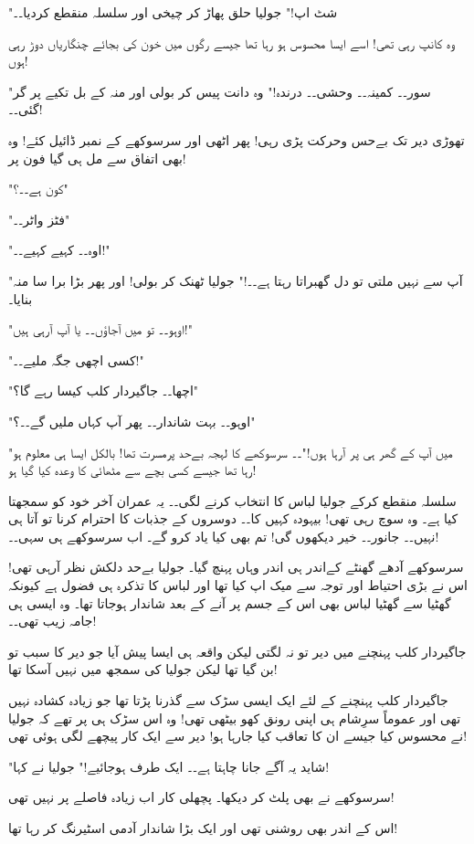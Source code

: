"شٹ اپ!" جولیا حلق پھاڑ کر چیخی اور سلسلہ منقطع کردیا۔۔

وہ کانپ رہی تھی! اسے ایسا محسوس ہو رہا تھا جیسے رگوں میں خون کی بجائے چنگاریاں دوڑ رہی ہوں!

"سور۔۔ کمینہ۔۔ وحشی۔۔ درندہ!" وہ دانت پیس کر بولی اور منہ کے بل تکیے پر گر گئی۔۔!

تھوڑی دیر تک بےحس وحرکت پڑی رہی! پھر اٹھی اور سرسوکھے کے نمبر ڈائیل کئے! وہ بھی اتفاق سے مل ہی گیا فون پر!

"کون ہے۔۔؟"

"فٹز واٹر۔۔"

"اوہ۔۔ کہیے کہیے۔۔!"

"آپ سے نہیں ملتی تو دل گھبراتا رہتا ہے۔۔!" جولیا ٹھنک کر بولی! اور پھر بڑا برا سا منہ بنایا۔

"اوہو۔۔ تو میں آجاؤں۔۔ یا آپ آرہی ہیں!"

"کسی اچھی جگہ ملیے۔۔!"

"اچھا۔۔ جاگیردار کلب کیسا رہے گا؟"

"اوہو۔۔ بہت شاندار۔۔ پھر آپ کہاں ملیں گے۔۔؟"

"میں آپ کے گھر ہی پر آرہا ہوں!"۔۔ سرسوکھے کا لہجہ بےحد پرمسرت تھا! بالکل ایسا ہی معلوم ہو رہا تھا جیسے کسی بچے سے مٹھائی کا وعدہ کیا گیا ہو!

سلسلہ منقطع کرکے جولیا لباس کا انتخاب کرنے لگی۔۔ یہ عمران آخر خود کو سمجھتا کیا ہے۔ وہ سوچ رہی تھی! بیہودہ کہیں کا۔۔ دوسروں کے جذبات کا احترام کرنا تو آتا ہی نہیں۔۔ جانور۔۔ خیر دیکھوں گی! تم بھی کیا یاد کرو گے۔ اب سرسوکھے ہی سہی۔۔!

سرسوکھے آدھے گھنٹے کےاندر ہی اندر وہاں پہنچ گیا۔ جولیا بےحد دلکش نظر آرہی تھی! اس نے بڑی احتیاط اور توجہ سے میک اپ کیا تھا اور لباس کا تذکرہ ہی فضول ہے کیونکہ گھٹیا سے گھٹیا لباس بھی اس کے جسم پر آنے کے بعد شاندار ہوجاتا تھا۔ وہ ایسی ہی جامہ زیب تھی۔۔!

جاگیردار کلب پہنچنے میں دیر تو نہ لگتی لیکن واقعہ ہی ایسا پیش آیا جو دیر کا سبب تو بن گیا تھا لیکن جولیا کی سمجھ میں نہیں آسکا تھا!

جاگیردار کلب پہنچنے کے لئے ایک ایسی سڑک سے گذرنا پڑتا تھا جو زیادہ کشادہ نہیں تھی اور عموماً سرِشام ہی اپنی رونق کھو بیٹھی تھی! وہ اس سڑک ہی پر تھے کہ جولیا نے محسوس کیا جیسے ان کا تعاقب کیا جارہا ہو! دیر سے ایک کار پیچھے لگی ہوئی تھی!

"شاید یہ آگے جانا چاہتا ہے۔۔ ایک طرف ہوجائیے!" جولیا نے کہا!

سرسوکھے نے بھی پلٹ کر دیکھا۔ پچھلی کار اب زیادہ فاصلے پر نہیں تھی!

اس کے اندر بھی روشنی تھی اور ایک بڑا شاندار آدمی اسٹیرنگ کر رہا تھا!

